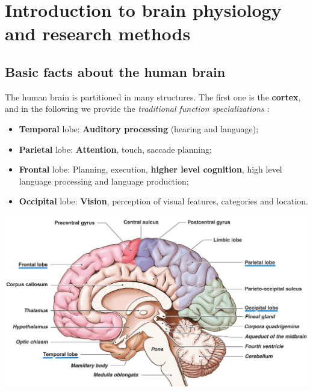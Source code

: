 \chapter{Introduction to brain physiology and research methods}
\label{chap:introduction}

\section{Basic facts about the human brain}
The human brain is partitioned in many structures. The first one is the \textbf{cortex}, and in the following we provide the \textit{traditional function specializations} \notet:
\begin{itemize}
    \item \textbf{Temporal} lobe: \textbf{Auditory processing} (hearing and language);
    \item \textbf{Parietal} lobe: \textbf{Attention}, touch, saccade planning;
    \item \textbf{Frontal} lobe: Planning, execution, \textbf{higher level cognition}, high level language processing and language production;
    \item \textbf{Occipital} lobe: \textbf{Vision}, perception of visual features, categories and location.
\end{itemize}

\includegraphics[width=\textwidth]{images/brain.png}


